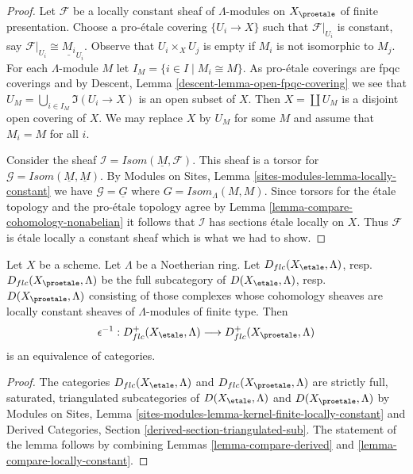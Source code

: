 \begin{proof}
Let $\mathcal{F}$ be a locally constant sheaf of $\Lambda$-modules
on $X_\proetale$ of finite presentation. Choose a pro-\'etale covering
$\{U_i \to X\}$ such that $\mathcal{F}|_{U_i}$ is constant, say
$\mathcal{F}|_{U_i} \cong \underline{M_i}_{U_i}$.
Observe that $U_i \times_X U_j$ is empty if $M_i$ is not isomorphic
to $M_j$.
For each $\Lambda$-module $M$ let $I_M = \{i \in I \mid M_i \cong M\}$.
As pro-\'etale coverings are fpqc coverings and by
Descent, Lemma \ref{descent-lemma-open-fpqc-covering}
we see that $U_M = \bigcup_{i \in I_M} \Im(U_i \to X)$
is an open subset of $X$. Then $X = \coprod U_M$ is a disjoint
open covering of $X$. We may replace $X$ by $U_M$ for some $M$ and
assume that $M_i = M$ for all $i$.

\medskip\noindent
Consider the sheaf $\mathcal{I} = \mathit{Isom}(\underline{M}, \mathcal{F})$.
This sheaf is a torsor for
$\mathcal{G} = \mathit{Isom}(\underline{M}, \underline{M})$.
By Modules on Sites, Lemma \ref{sites-modules-lemma-locally-constant}
we have $\mathcal{G} = \underline{G}$
where $G = \mathit{Isom}_\Lambda(M, M)$.
Since torsors for the \'etale topology
and the pro-\'etale topology agree by
Lemma \ref{lemma-compare-cohomology-nonabelian}
it follows that $\mathcal{I}$ has sections \'etale locally on $X$.
Thus $\mathcal{F}$ is \'etale locally a constant sheaf which is
what we had to show.
\end{proof}

\begin{lemma}
\label{lemma-compare-locally-constant-derived}
Let $X$ be a scheme. Let $\Lambda$ be a Noetherian ring.
Let $D_{flc}(X_\etale, \Lambda)$, resp.\ $D_{flc}(X_\proetale, \Lambda)$
be the full subcategory of
$D(X_\etale, \Lambda)$, resp.\ $D(X_\proetale, \Lambda)$
consisting of those complexes whose cohomology sheaves are locally
constant sheaves of $\Lambda$-modules of finite type. Then
$$
\epsilon^{-1} :
D_{flc}^+(X_\etale, \Lambda)
\longrightarrow
D_{flc}^+(X_\proetale, \Lambda)
$$
is an equivalence of categories.
\end{lemma}

\begin{proof}
The categories $D_{flc}(X_\etale, \Lambda)$ and $D_{flc}(X_\proetale, \Lambda)$
are strictly full, saturated, triangulated subcategories of
$D(X_\etale, \Lambda)$ and $D(X_\proetale, \Lambda)$
by Modules on Sites, Lemma
\ref{sites-modules-lemma-kernel-finite-locally-constant}
and
Derived Categories, Section \ref{derived-section-triangulated-sub}.
The statement of the lemma follows by combining
Lemmas \ref{lemma-compare-derived} and
\ref{lemma-compare-locally-constant}.
\end{proof}

